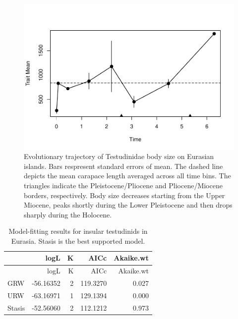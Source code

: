 \begin{figure}[H]
	\centering
	\includegraphics{MA_JJ_files/figure-latex/pTSEsI-1.pdf}
	\caption[PaleoTS plot of insular \T in Eurasia]{Evolutionary trajectory of Testudinidae body size on Eurasian islands. Bars respresent standard errors of mean. The dashed line depicts the mean carapace length averaged across all time bins. The triangles indicate the Pleistocene/Pliocene and Pliocene/Miocene borders, respectively. Body size decreases starting from the Upper Miocene, peaks shortly during the Lower Pleistocene and then drops sharply during the Holocene.
	}
	\label{fig:pTSEsI}
\end{figure}

\begin{longtable}[]{@{}lrrrr@{}}
	\caption[Model fits for insular \T in Eurasia]{Model-fitting results for insular testudinids in Eurasia. Stasis is the best supported model.}
	\label{tab:pTSEsI}
	\tabularnewline
	\toprule
	& logL & K & AICc & Akaike.wt\tabularnewline
	\midrule
	\endfirsthead
	\toprule
	& logL & K & AICc & Akaike.wt\tabularnewline
	\midrule
	\endhead
	GRW & -56.16352 & 2 & 119.3270 & 0.027\tabularnewline
	URW & -63.16971 & 1 & 129.1394 & 0.000\tabularnewline
	Stasis & -52.56060 & 2 & 112.1212 & 0.973\tabularnewline
	\bottomrule
\end{longtable}


\FloatBarrier







